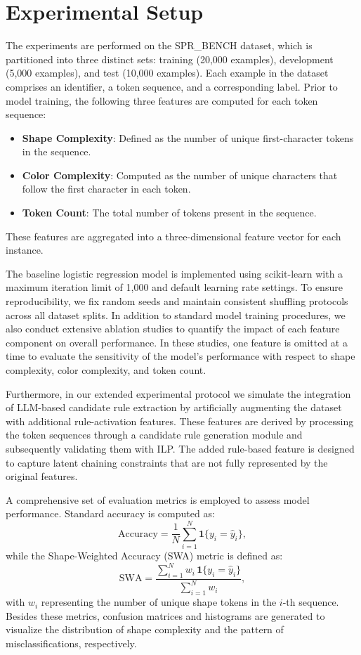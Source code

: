 \documentclass{article}
\begin{document}
\section{Experimental Setup}
The experiments are performed on the SPR\_BENCH dataset, which is partitioned into three distinct sets: training (20,000 examples), development (5,000 examples), and test (10,000 examples). Each example in the dataset comprises an identifier, a token sequence, and a corresponding label. Prior to model training, the following three features are computed for each token sequence:
\begin{itemize}
    \item \textbf{Shape Complexity}: Defined as the number of unique first-character tokens in the sequence.
    \item \textbf{Color Complexity}: Computed as the number of unique characters that follow the first character in each token.
    \item \textbf{Token Count}: The total number of tokens present in the sequence.
\end{itemize}
These features are aggregated into a three-dimensional feature vector for each instance.

The baseline logistic regression model is implemented using scikit-learn with a maximum iteration limit of 1,000 and default learning rate settings. To ensure reproducibility, we fix random seeds and maintain consistent shuffling protocols across all dataset splits. In addition to standard model training procedures, we also conduct extensive ablation studies to quantify the impact of each feature component on overall performance. In these studies, one feature is omitted at a time to evaluate the sensitivity of the model’s performance with respect to shape complexity, color complexity, and token count.

Furthermore, in our extended experimental protocol we simulate the integration of LLM-based candidate rule extraction by artificially augmenting the dataset with additional rule-activation features. These features are derived by processing the token sequences through a candidate rule generation module and subsequently validating them with ILP. The added rule-based feature is designed to capture latent chaining constraints that are not fully represented by the original features.

A comprehensive set of evaluation metrics is employed to assess model performance. Standard accuracy is computed as:
\[
\text{Accuracy} = \frac{1}{N}\sum_{i=1}^{N}\mathbf{1}\{y_i = \hat{y}_i\},
\]
while the Shape-Weighted Accuracy (SWA) metric is defined as:
\[
\mathrm{SWA} = \frac{\sum_{i=1}^{N} w_i\,\mathbf{1}\{y_i = \hat{y}_i\}}{\sum_{i=1}^{N} w_i},
\]
with \(w_i\) representing the number of unique shape tokens in the \(i\)-th sequence. Besides these metrics, confusion matrices and histograms are generated to visualize the distribution of shape complexity and the pattern of misclassifications, respectively.
\end{document}
